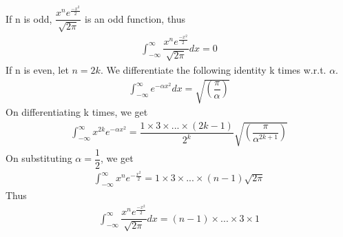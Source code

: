 \documentclass[journal,12pt,twocolumn]{IEEEtran}
\begin{document}
If n is odd, $\dfrac{x^n e^{\frac{-x^2}{2}}}{\sqrt{2\pi}}$ is an odd function, thus
\begin{align}
    \int_{-\infty}^{\infty} \dfrac{x^n e^{\frac{-x^2}{2}}}{\sqrt{2\pi}}dx = 0
\end{align}
If n is even, let $n = 2k$. We differentiate the following identity k times w.r.t. $\alpha$.
\begin{align}
    \int_{-\infty}^{\infty}e^{-\alpha x^2}dx = \sqrt{\left( \dfrac{\pi}{\alpha}\right)}
\end{align}
On differentiating k times, we get
\begin{align}
    \int_{-\infty}^{\infty}x^{2k}e^{-\alpha x^2} = \dfrac{1\times3\times...\times(2k-1)}{2^k}  \sqrt{\left(\dfrac{\pi}{\alpha^{2k+1}}\right)}
\end{align}
On substituting $\alpha = \dfrac{1}{2}$, we get
\begin{align}
    \int_{-\infty}^{\infty}x^{n}e^{-\frac{x^2}{2}} = 1\times3\times...\times(n-1) \sqrt{2 \pi}
\end{align}
Thus
\begin{align}
     \int_{-\infty}^{\infty} \dfrac{x^n e^{\frac{-x^2}{2}}}{\sqrt{2\pi}}dx = (n-1)\times...\times3\times1
\end{align}
\end{document}
